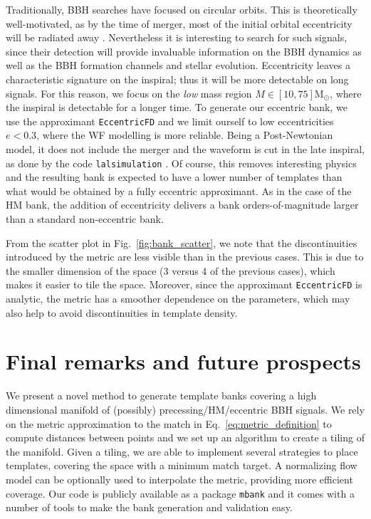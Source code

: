 \documentclass[twocolumn,showpacs,preprintnumbers,nofootinbib,prd,
superscriptaddress,10pt]{revtex4-2}
\begin{document}
Traditionally, BBH searches have focused on circular orbits.
This is theoretically well-motivated, as by the time of merger, most of the initial orbital eccentricity will be radiated away \cite{Maggiore:2007ulw, Blanchet:2013haa}. Nevertheless it is interesting to search for such signals, since their detection will provide invaluable information on the BBH dynamics as well as the BBH formation channels and stellar evolution.
Eccentricity leaves a characteristic signature on the inspiral; thus it will be more detectable on long signals. For this reason, we focus on the {\it low} mass region $M\in [10,75] \mathrm{M_\odot}$, where the inspiral is detectable for a longer time.
To generate our eccentric bank, we use the approximant \texttt{EccentricFD} \cite{PhysRevD.93.124061} and we limit ourself to low eccentricities $e<0.3$, where the WF modelling is more reliable. Being a Post-Newtonian model, it does not include the merger and the waveform is cut in the late inspiral, as done by the code \texttt{lalsimulation} \cite{lalsuite}. Of course, this removes interesting physics and the resulting bank is expected to have a lower number of templates than what would be obtained by a fully eccentric approximant.
As in the case of the HM bank, the addition of eccentricity delivers a bank orders-of-magnitude larger than a standard non-eccentric bank.

From the scatter plot in Fig.~\ref{fig:bank_scatter}, we note that the discontinuities introduced by the metric are less visible than in the previous cases. This is due to the smaller dimension of the space (3 versus 4 of the previous cases), which makes it easier to tile the space. Moreover, since the approximant \texttt{EccentricFD} is analytic, the metric has a smoother dependence on the parameters, which may also help to avoid discontinuities in template density.

\section{Final remarks and future prospects} \label{sec:conclusion}

We present a novel method to generate template banks covering a high dimensional manifold of (possibly) precessing/HM/eccentric BBH signals.
We rely on the metric approximation to the match in Eq.~\eqref{eq:metric_definition} to compute distances between points and we set up an algorithm to create a tiling of the manifold. Given a tiling, we are able to implement several strategies to place templates, covering the space with a minimum match target.
A normalizing flow model can be optionally used to interpolate the metric, providing more efficient coverage.
Our code is publicly available as a package \texttt{mbank} and it comes with a number of tools to make the bank generation and validation easy.
\end{document}
